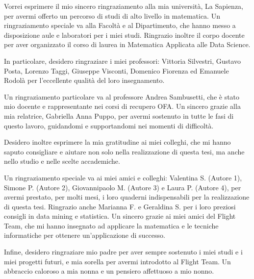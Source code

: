 \begin{acknowledgments}
Vorrei esprimere il mio sincero ringraziamento alla mia università, La Sapienza, per avermi offerto un percorso di studi di alto livello in matematica. Un ringraziamento speciale va alla Facoltà e al Dipartimento, che hanno messo a disposizione aule e laboratori per i miei studi. Ringrazio inoltre il corpo docente per aver organizzato il corso di laurea in Matematica Applicata alle Data Science.

\bigskip \noindent In particolare, desidero ringraziare i miei professori: Vittoria Silvestri, Gustavo Posta, Lorenzo Taggi, Giuseppe Visconti, Domenico Fiorenza ed Emanuele Rodolà per l’eccellente qualità del loro insegnamento.

\noindent Un ringraziamento particolare va al professore Andrea Sambusetti, che è stato mio docente e rappresentante nei corsi di recupero OFA. Un sincero grazie alla mia relatrice, Gabriella Anna Puppo, per avermi sostenuto in tutte le fasi di questo lavoro, guidandomi e supportandomi nei momenti di difficoltà.

\noindent Desidero inoltre esprimere la mia gratitudine ai miei colleghi, che mi hanno saputo consigliare e aiutare non solo nella realizzazione di questa tesi, ma anche nello studio e nelle scelte accademiche.

\bigskip \noindent Un ringraziamento speciale va ai miei amici e colleghi: Valentina S. (Autore 1), Simone P. (Autore 2), Giovannipaolo M. (Autore 3) e Laura P. (Autore 4), per avermi prestato, per molti mesi, i loro quaderni indispensabili per la realizzazione di questa tesi. Ringrazio anche Marianna F. e Geraldina S. per i loro preziosi consigli in data mining e statistica. Un sincero grazie ai miei amici del Flight Team, che mi hanno insegnato ad applicare la matematica e le tecniche informatiche per ottenere un'applicazione di successo.

\noindent Infine, desidero ringraziare mio padre per aver sempre sostenuto i miei studi e i miei progetti futuri, e mia sorella per avermi introdotto al Flight Team. Un abbraccio caloroso a mia nonna e un pensiero affettuoso a mio nonno.
\end{acknowledgments}
